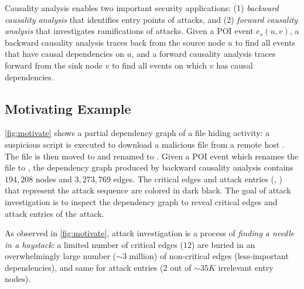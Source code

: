 Causality analysis enables two important security applications:
(1) \emph{backward causality analysis} that identifies entry points of attacks, and (2) \emph{forward causality analysis} that investigates ramifications of attacks.
Given a POI event $e_s(u,v)$, a backward causality analysis traces back from the source node $u$ to find all events that have causal dependencies on $u$,
and a forward causality analysis traces forward from the sink node $v$ to find all events on which $v$ has causal dependencies.







\subsection{Motivating Example}
\label{subsec:motivating-example}

\cref{fig:motivate} shows a partial dependency graph of a 
file hiding activity: 
a suspicious script  is executed to download a malicious file  from a remote host . The file is then moved to  and renamed to .
%
Given a POI event which renames the file to , the dependency graph produced by backward causality analysis 
contains $194,208$ nodes and $3,273,769$ edges.
The critical edges and attack entries (, ) that represent the attack sequence are colored in dark black.
%
The goal of attack investigation is to inspect the dependency graph to
reveal critical edges and attack entries of the attack.


As observed in \cref{fig:motivate}, attack investigation is a process of \emph{finding a needle in a haystack}: 
a limited number of critical edges (\ie $12$) are buried in an overwhelmingly large number ($\sim 3$ million) of non-critical edges (\ie less-important dependencies),
and same for attack entries (\ie $2$ out of $\sim 35K$ irrelevant entry nodes).



